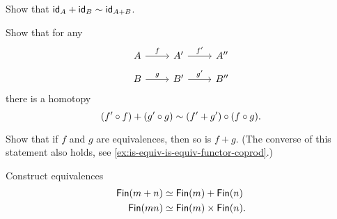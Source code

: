 \begin{exercises}
\begin{subexenum}
\begin{equation*}
    \end{equation*}
  \item Show that $\idfunc[A]+\idfunc[B]\htpy \idfunc[A+B]$.
  \item Show that for any
    \begin{equation*}
      \begin{tikzcd}[row sep=small]
        A \arrow[r,"f"] & {A'} \arrow[r,"{f'}"] & {A''} \\
        B \arrow[r,"g"] & {B'} \arrow[r,"{g'}"] & {B''}
      \end{tikzcd}
    \end{equation*}
    there is a homotopy
    \begin{equation*}
      (f'\circ f)+(g'\circ g) \htpy (f'+g')\circ (f\circ g).
    \end{equation*}
  \item \label{ex:coproduct_functor_equivalence}Show that if $f$ and $g$ are equivalences, then so is $f+g$. (The converse of this statement also holds, see \cref{ex:is-equiv-is-equiv-functor-coprod}.)
  \end{subexenum}
  \exercise Construct equivalences
  \begin{align*}
    \Fin(m+n) & \simeq \Fin(m)+\Fin(n) \\
    \Fin(mn) & \simeq \Fin(m)\times\Fin(n).
  \end{align*}
\end{exercises}
